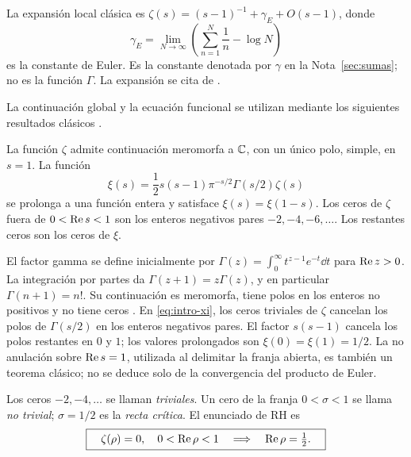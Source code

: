 La expansión local clásica es
$\zeta(s)=(s-1)^{-1}+\gamma_E+O(s-1)$, donde
\[
 \gamma_E=\lim_{N\to\infty}\left(\sum_{n=1}^N\frac1n-\log N\right)
\]
es la constante de Euler. Es la constante denotada por $\gamma$ en la
Nota~\ref{sec:sumas}; no es la función $\Gamma$. La expansión se cita
de \cite[ecuación 25.2.4]{dlmf-zeta}.

La continuación global y la ecuación funcional se utilizan mediante
los siguientes resultados clásicos
\cite[§§25.2, 25.4 y 25.10]{dlmf-zeta}.

\begin{teorema}
La función $\zeta$ admite continuación meromorfa a $\mathbb{C}$, con un único
polo, simple, en $s=1$. La función
\begin{equation}
 \xi(s)=\frac12 s(s-1)\pi^{-s/2}\Gamma(s/2)\zeta(s)
 \label{eq:intro-xi}
\end{equation}
se prolonga a una función entera y satisface $\xi(s)=\xi(1-s)$.
Los ceros de $\zeta$ fuera de $0<\operatorname{Re} s<1$ son los enteros negativos
pares $-2,-4,-6,\ldots$. Los restantes ceros son los ceros de $\xi$.
\end{teorema}

El factor gamma se define inicialmente por
$\Gamma(z)=\int_0^\infty t^{z-1}e^{-t}\dd t$ para $\operatorname{Re} z>0$.
La integración por partes da $\Gamma(z+1)=z\Gamma(z)$, y en particular
$\Gamma(n+1)=n!$. Su continuación es meromorfa, tiene polos en los enteros
no positivos y no tiene ceros \cite[§5.2]{dlmf-analisis}. En
\eqref{eq:intro-xi}, los ceros triviales de $\zeta$ cancelan los polos
de $\Gamma(s/2)$ en los enteros negativos pares. El factor $s(s-1)$
cancela los polos restantes en $0$ y $1$; los valores prolongados son
$\xi(0)=\xi(1)=1/2$. La no anulación sobre $\operatorname{Re} s=1$, utilizada
al delimitar la franja abierta, es también un teorema clásico; no se deduce
solo de la convergencia del producto de Euler.

Los ceros $-2,-4,\ldots$ se llaman \emph{triviales}. Un cero de la franja
$0<\sigma<1$ se llama \emph{no trivial}; $\sigma=1/2$ es la
\emph{recta crítica}. El enunciado de RH es
\begin{equation}
 \boxed{\quad \zeta(\rho)=0,\quad 0<\operatorname{Re}\rho<1
       \quad\Longrightarrow\quad \operatorname{Re}\rho=\tfrac12.\quad}
 \label{eq:intro-rh}
\end{equation}

